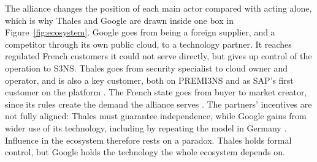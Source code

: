 The alliance changes the position of each main actor compared with acting
alone, which is why Thales and Google are drawn inside one box in
Figure~\ref{fig:ecosystem}. Google goes from being a foreign supplier, and a
competitor through its own public cloud, to a technology partner. It reaches
regulated French customers it could not serve directly, but gives up control of
the operation to S3NS. Thales goes from security specialist to cloud owner and
operator, and is also a key customer, both on PREMI3NS and as SAP's first
customer on the platform \parencite{thalessap2026}. The French state goes from
buyer to market creator, since its rules create the demand the alliance serves
\parencite{decretsren2026}. The partners' incentives are not fully aligned:
Thales must guarantee independence, while Google gains from wider use of its
technology, including by repeating the model in Germany
\parencite{thalesgoogle2026}. Influence in the ecosystem therefore rests on a
paradox. Thales holds formal control, but Google holds the technology the whole
ecosystem depends on.